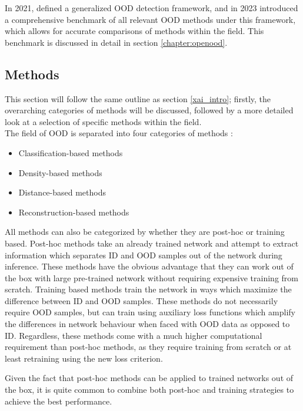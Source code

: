 \documentclass[UKenglish]{uiomasterthesis} %
\theoremstyle{definition}
\begin{document}
In 2021, \cite{oodoverview} defined a generalized OOD detection framework, and in 2023 \cite{openood} introduced a comprehensive benchmark of all relevant OOD methods under this framework, which allows for accurate comparisons of methods within the field. This benchmark is discussed in detail in section \ref{chapter:openood}.

\subsection{Methods}

This section will follow the same outline as section \ref{xai_intro}; firstly, the overarching categories of methods will be discussed, followed by a more detailed look at a selection of specific methods within the field.
\\

The field of OOD is separated into four categories of methods \cite{oodoverview}:

\begin{itemize}
  \item Classification-based methods
  \item Density-based methods
  \item Distance-based methods
  \item Reconstruction-based methods
\end{itemize}

All methods can also be categorized by whether they are post-hoc or training based. Post-hoc methods take an already trained network and attempt to extract information which separates ID and OOD samples out of the network during inference. These methods have the obvious advantage that they can work out of the box with large pre-trained network without requiring expensive training from scratch. Training based methods train the network in ways which maximize the difference between ID and OOD samples. These methods do not necessarily require OOD samples, but can train using auxiliary loss functions which amplify the differences in network behaviour when faced with OOD data as opposed to ID. Regardless, these methods come with a much higher computational requirement than post-hoc methods, as they require training from scratch or at least retraining using the new loss criterion. 

Given the fact that post-hoc methods can be applied to trained networks out of the box, it is quite common to combine both post-hoc and training strategies to achieve the best performance.
\end{document}
